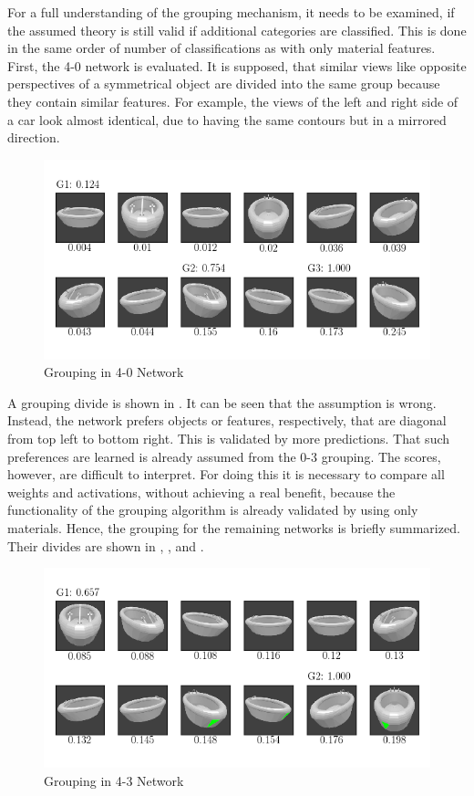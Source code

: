 For a full understanding of the grouping mechanism, it needs to be examined, if the assumed theory is still valid if additional categories are classified.
This is done in the same order of number of classifications as with only material features.
First, the 4-0 network is evaluated.
It is supposed, that similar views like opposite perspectives of a symmetrical object are divided into the same group because they contain similar features.
For example, the views of the left and right side of a car look almost identical, due to having the same contours but in a mirrored direction.
\begin{figure}
	\centering
	\includegraphics[trim=10 20 10 20, clip]{images/mn-sl-4-0-20/bathtub_0107_0_grouping.png}
	\caption{Grouping in 4-0 Network}
	\label{fig:grouping-4-0}
\end{figure}
A grouping divide is shown in .
It can be seen that the assumption is wrong.
Instead, the network prefers objects or features, respectively, that are diagonal from top left to bottom right.
This is validated by more predictions.
That such preferences are learned is already assumed from the 0-3 grouping.
The scores, however, are difficult to interpret.
For doing this it is necessary to compare all weights and activations, without achieving a real benefit, because the functionality of the grouping algorithm is already validated by using only materials.
Hence, the grouping for the remaining networks is briefly summarized.
Their divides are shown in , ,  and .
\begin{figure}
	\centering
	\includegraphics[trim=10 20 10 20, clip]{images/mn-sl-4-3-20/bathtub_0107_1_grouping.png}
	\caption{Grouping in 4-3 Network}
	\label{fig:grouping-4-3}
\end{figure}
